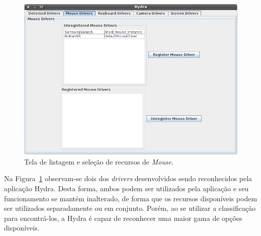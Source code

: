 \begin{figure}[ht]
	\center
	\includegraphics[scale=0.5]{imagens/printscreenMouseDrivers}
	\caption{Tela de listagem e seleção de recursos de \emph{Mouse}.}
	\label{fig:printscreen_hydra}
\end{figure}

Na Figura~\ref{fig:printscreen_hydra} observam-se dois dos \emph{drivers} desenvolvidos sendo reconhecidos pela aplicação Hydra. Desta forma, ambos podem ser utilizados pela aplicação e seu funcionamento se mantém inalterado, de forma que os recursos disponíveis podem ser utilizados separadamente ou em conjunto. Porém, ao se utilizar a classificação para encontrá-los, a Hydra é capaz de reconhecer uma maior gama de opções disponíveis.